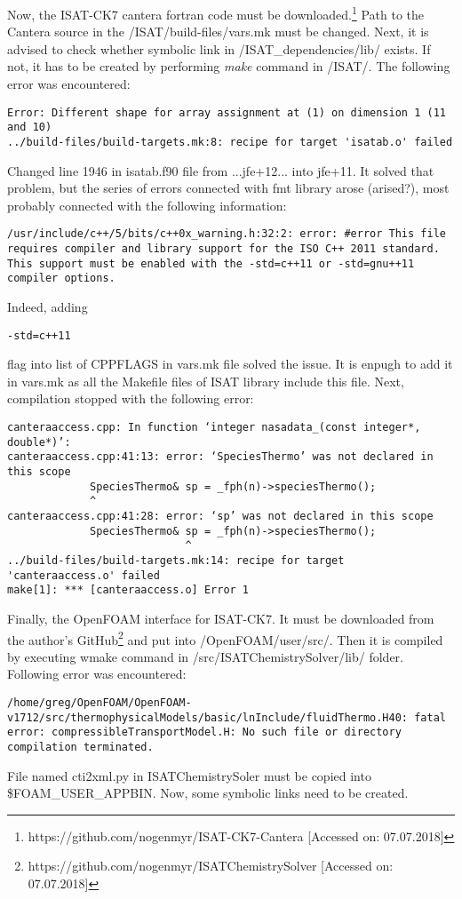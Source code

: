 \documentclass[12pt,english]{article}
\begin{document}
Now, the ISAT-CK7 cantera fortran code must be downloaded.\footnote{https://github.com/nogenmyr/ISAT-CK7-Cantera [Accessed on: 07.07.2018]} Path to the Cantera source in the /ISAT/build-files/vars.mk must be changed. Next, it is advised to check whether symbolic link in /ISAT_dependencies/lib/ exists. If not, it has to be created by performing \textit{make} command in /ISAT/. The following error was encountered:
\begin{lstlisting}
Error: Different shape for array assignment at (1) on dimension 1 (11 and 10)
../build-files/build-targets.mk:8: recipe for target 'isatab.o' failed
\end{lstlisting}
Changed line 1946 in isatab.f90 file from ...jfe+12... into jfe+11.
It solved that problem, but the series of errors connected with fmt library arose (arised?), most probably connected with the following information:
\begin{lstlisting}
/usr/include/c++/5/bits/c++0x_warning.h:32:2: error: #error This file requires compiler and library support for the ISO C++ 2011 standard. This support must be enabled with the -std=c++11 or -std=gnu++11 compiler options.
\end{lstlisting}
Indeed, adding \begin{lstlisting}-std=c++11 \end{lstlisting} flag into list of CPPFLAGS in vars.mk file solved the issue. It is enpugh to add it in vars.mk as all the Makefile files of ISAT library include this file. Next, compilation stopped with the following error:
\begin{lstlisting}
canteraaccess.cpp: In function ‘integer nasadata_(const integer*, double*)’:
canteraaccess.cpp:41:13: error: ‘SpeciesThermo’ was not declared in this scope
             SpeciesThermo& sp = _fph(n)->speciesThermo();
             ^
canteraaccess.cpp:41:28: error: ‘sp’ was not declared in this scope
             SpeciesThermo& sp = _fph(n)->speciesThermo();
                            ^
../build-files/build-targets.mk:14: recipe for target 'canteraaccess.o' failed
make[1]: *** [canteraaccess.o] Error 1
\end{lstlisting}
 


Finally, the OpenFOAM interface for ISAT-CK7. It must be downloaded from the author's GitHub\footnote{https://github.com/nogenmyr/ISATChemistrySolver [Accessed on: 07.07.2018]} and put into /OpenFOAM/user/src/. Then it is compiled by executing wmake command in /src/ISATChemistrySolver/lib/ folder. Following error was encountered:
\begin{lstlisting}
/home/greg/OpenFOAM/OpenFOAM-v1712/src/thermophysicalModels/basic/lnInclude/fluidThermo.H40: fatal error: compressibleTransportModel.H: No such file or directory
compilation terminated.
\end{lstlisting}
File named cti2xml.py in ISATChemistrySoler must be copied into \$FOAM_USER_APPBIN.
Now, some symbolic links need to be created.
\end{document}
